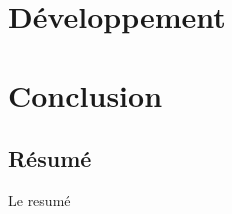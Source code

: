 \documentclass[a4paper, 11pt]{report}
\begin{document}
\chapter{Développement}

\chapter*{Conclusion}
\newpage
\begin{center}
    \vspace*{\fill} %
    \section*{Résumé}
    \begin{justify}
Le resumé
    \end{justify}
\end{center}
\end{document}
